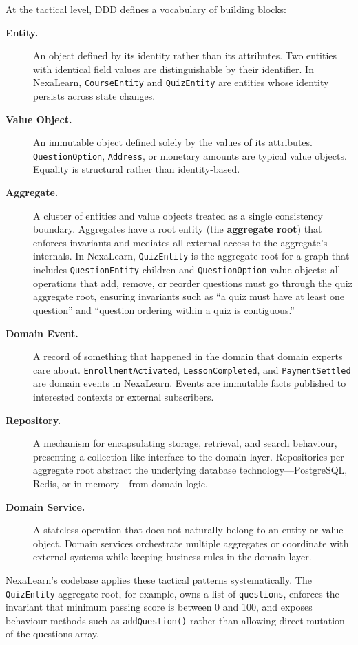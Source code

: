 At the tactical level, DDD defines a vocabulary of building blocks:

\begin{description}
  \item[\textbf{Entity.}] An object defined by its identity rather than its attributes. Two entities with identical field values are distinguishable by their identifier. In NexaLearn, \texttt{CourseEntity} and \texttt{QuizEntity} are entities whose identity persists across state changes.
  \item[\textbf{Value Object.}] An immutable object defined solely by the values of its attributes. \texttt{QuestionOption}, \texttt{Address}, or monetary amounts are typical value objects. Equality is structural rather than identity-based.
  \item[\textbf{Aggregate.}] A cluster of entities and value objects treated as a single consistency boundary. Aggregates have a root entity (the \textbf{aggregate root}) that enforces invariants and mediates all external access to the aggregate's internals. In NexaLearn, \texttt{QuizEntity} is the aggregate root for a graph that includes \texttt{QuestionEntity} children and \texttt{QuestionOption} value objects; all operations that add, remove, or reorder questions must go through the quiz aggregate root, ensuring invariants such as ``a quiz must have at least one question'' and ``question ordering within a quiz is contiguous.''
  \item[\textbf{Domain Event.}] A record of something that happened in the domain that domain experts care about. \texttt{EnrollmentActivated}, \texttt{LessonCompleted}, and \texttt{PaymentSettled} are domain events in NexaLearn. Events are immutable facts published to interested contexts or external subscribers.
  \item[\textbf{Repository.}] A mechanism for encapsulating storage, retrieval, and search behaviour, presenting a collection-like interface to the domain layer. Repositories per aggregate root abstract the underlying database technology---PostgreSQL, Redis, or in-memory---from domain logic.
  \item[\textbf{Domain Service.}] A stateless operation that does not naturally belong to an entity or value object. Domain services orchestrate multiple aggregates or coordinate with external systems while keeping business rules in the domain layer.
\end{description}

NexaLearn's codebase applies these tactical patterns systematically. The \texttt{QuizEntity} aggregate root, for example, owns a list of \texttt{questions}, enforces the invariant that minimum passing score is between 0 and 100, and exposes behaviour methods such as \texttt{addQuestion()} rather than allowing direct mutation of the questions array.


